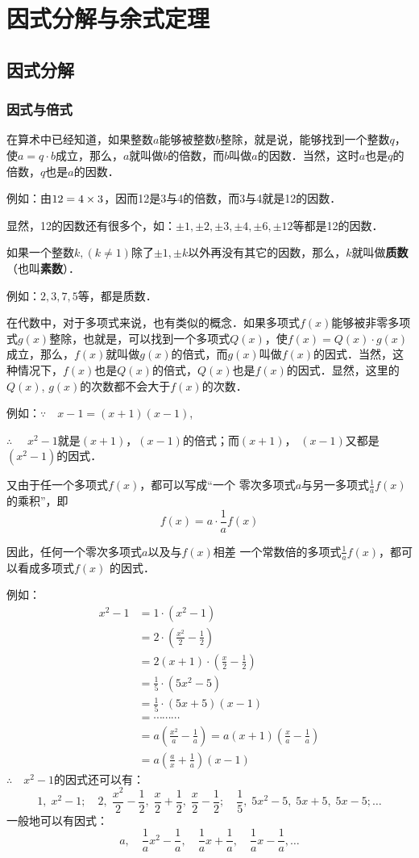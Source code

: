 \chapter{因式分解与余式定理}
\section{因式分解}
\subsection{因式与倍式}

在算术中已经知道，如果整数$a$能够被整数$b$整除，就是说，能够找到一个整数$q$，使$a=q\cdot b$成立，那么，$a$就叫做$b$的倍数，而$b$叫做$a$的因数．当然，这时$a$也是$q$的倍数，$q$也是$a$的因数．

例如：由$12=4\times3$，因而12是3与4的倍数，而3与4就是12的因数．

显然，12的因数还有很多个，如：$\pm1,\pm2,\pm3,\pm4,\pm6,\pm12$等都是12的因数．

如果一个整数$k, (k\ne 1)$除了$\pm1,\pm k$以外再没有其它的因数，那么，$k$就叫做\textbf{质数}（也叫\textbf{素数}）．

例如：$2, 3, 7, 5$等，都是质数．

在代数中，对于多项式来说，也有类似的概念．如果多项式$f(x)$能够被非零多项式$g(x)$整除，也就是，可以找到一个多项式$Q(x)$，使$f(x)=Q(x)\cdot g(x)$成立，那么，$f(x)$就叫做$g(x)$的倍式，而$g(x)$叫做$f(x)$的因式．当然，这种情况下，$f(x)$也是$Q(x)$的倍式，$Q(x)$也是$f(x)$的因式．显然，这里的$Q(x)$, $g(x)$的次数都不会大于$f(x)$的次数．

例如：$\because\quad x-1=(x+1)(x-1)$,

$\therefore\quad $ $x^2-1$就是$(x+1)$，$(x-1)$的倍式；而$(x+1)$，
$(x-1)$又都是$(x^2-1)$的因式．

又由于任一个多项式$f(x)$，都可以写成“一个
零次多项式$a$与另一多项式$\frac{1}{a}f(x)$的乘积”，即
\[f(x)=a\cdot \frac{1}{a}f(x)\]

因此，任何一个零次多项式$a$以及与$f(x)$相差
一个常数倍的多项式$\frac{1}{a}f(x)$，都可以看成多项式$f(x)$
的因式．

例如：\[\begin{split}
x^2-1&= 1\cdot (x^2-1)\\
&=2\cdot \left(\frac{x^2}{2}-\frac{1}{2}\right)\\    
&=2(x+1)\cdot \left(\frac{x}{2}-\frac{1}{2}\right)\\
&=\frac{1}{5}\cdot (5x^2-5)\\
&=\frac{1}{5}\cdot (5x+5)(x-1)\\
&=\cdots \cdots \cdots \\
&=a\left(\frac{x^2}{a}-\frac{1}{a}\right)=a(x+1)\left(\frac{x}{a}-\frac{1}{a}\right)\\
&=a\left(\frac{a}{x}+\frac{1}{a}\right)(x-1)
\end{split}\]
$\therefore\quad x^2-1$的因式还可以有：
\[1,\; x^2-1;\quad 2,\; \frac{x^2}{2}-\frac{1}{2},\; \frac{x}{2}+\frac{1}{2},\; \frac{x}{2}-\frac{1}{2};\quad \frac{1}{5},\; 5x^2-5,\; 5x+5,\; 5x-5; \ldots \]
一般地可以有因式：
\[a,\quad \frac{1}{a}x^2-\frac{1}{a},\quad \frac{1}{a}x+\frac{1}{a},\quad \frac{1}{a}x-\frac{1}{a},\ldots\]

